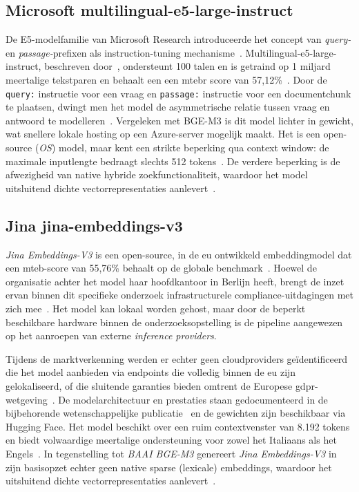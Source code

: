 \subsection{Microsoft multilingual-e5-large-instruct}

De E5-modelfamilie van Microsoft Research introduceerde het concept van \textit{query-} en \textit{passage-}prefixen als instruction-tuning mechanisme~\autocite{WangEtAl2022}. Multilingual-e5-large-instruct, beschreven door~\textcite{WangEtAl2024b}, ondersteunt 100 talen en is getraind op 1 miljard meertalige tekstparen en behaalt een een \gls{mtebr} score van 57,12\%~\autocite{MTEBzd,Enevoldsen2025}. Door de \texttt{query:} instructie voor een vraag en \texttt{passage:} instructie voor een documentchunk te plaatsen, dwingt men het model de asymmetrische relatie tussen vraag en antwoord te modelleren~\autocite{Wang2024}. Vergeleken met BGE-M3 is dit model lichter in gewicht, wat snellere lokale hosting op een Azure-server mogelijk maakt. Het is een open-source (\textit{OS}) model, maar kent een strikte beperking qua context window: de maximale inputlengte bedraagt slechts 512 tokens~\autocite{WangEtAl2024b,intfloatzd}. De verdere beperking is de afwezigheid van native hybride zoekfunctionaliteit, waardoor het model uitsluitend dichte vectorrepresentaties aanlevert~\autocite{Mudet2025}.

\subsection{Jina jina-embeddings-v3}

\textit{Jina Embeddings-V3} is een open-source, in de \gls{eu} ontwikkeld embeddingmodel dat een \gls{mteb}-score van 55,76\% behaalt op de globale benchmark~\autocite{JinaAIazd,JinaAIbzd,MTEBzd}. Hoewel de organisatie achter het model haar hoofdkantoor in Berlijn heeft, brengt de inzet ervan binnen dit specifieke onderzoek infrastructurele compliance-uitdagingen met zich mee~\autocite{JinaAIazd}. Het model kan lokaal worden gehost, maar door de beperkt beschikbare hardware binnen de onderzoeksopstelling is de pipeline aangewezen op het aanroepen van externe \textit{inference providers}. 

Tijdens de marktverkenning werden er echter geen cloudproviders geïdentificeerd die het model aanbieden via endpoints die volledig binnen de \gls{eu} zijn gelokaliseerd, of die sluitende garanties bieden omtrent de Europese \gls{gdpr}-wetgeving~\autocite{JinaAIbzd}. De modelarchitectuur en prestaties staan gedocumenteerd in de bijbehorende wetenschappelijke publicatie~\autocite{JinaAI2024} en de gewichten zijn beschikbaar via Hugging Face. Het model beschikt over een ruim contextvenster van 8.192 tokens en biedt volwaardige meertalige ondersteuning voor zowel het Italiaans als het Engels~\autocite{JinaAI2024,Sturua2024}. In tegenstelling tot \textit{BAAI BGE-M3} genereert \textit{Jina Embeddings-V3} in zijn basisopzet echter geen native sparse (lexicale) embeddings, waardoor het uitsluitend dichte vectorrepresentaties aanlevert~\autocite{Handley2026,Sturua2024}.

